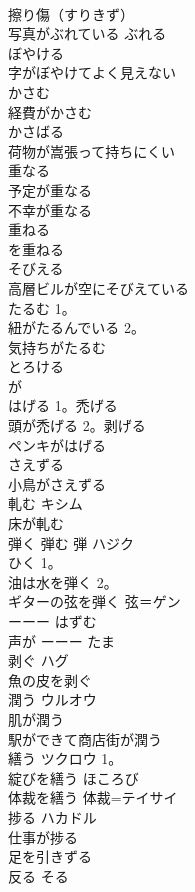 \documentclass[8pt]{extreport}
\begin{document}
\begin{CJK}{UTF8}{min}
\\	擦り傷（すりきず）
\\	写真がぶれている ぶれる	
\\	ぼやける	
\\	字がぼやけてよく見えない
\\	かさむ	
\\	経費がかさむ　
\\	かさばる	
\\	荷物が嵩張って持ちにくい
\\	重なる	
\\	予定が重なる 
\\	不幸が重なる 
\\	重ねる 
\\	を重ねる	
\\	そびえる	
\\	高層ビルが空にそびえている
\\	たるむ	1。
\\	紐がたるんでいる 2。
\\	気持ちがたるむ 
\\	とろける	
\\	が
\\	はげる	1。禿げる 
\\	頭が禿げる 2。剥げる 
\\	ペンキがはげる
\\	さえずる	
\\	小鳥がさえずる
\\	軋む	キシム 
\\	床が軋む
\\	弾く 弾む 弾	ハジク　
\\	ひく 1。
\\	油は水を弾く 2。
\\	ギターの弦を弾く 弦＝ゲン 
\\	ーーー はずむ 
\\	声が ーーー たま 
\\	剥ぐ	ハグ 
\\	魚の皮を剥ぐ
\\	潤う	ウルオウ 
\\	肌が潤う 
\\	駅ができて商店街が潤う
\\	繕う	ツクロウ 1。
\\	綻びを繕う ほころび　
\\	体裁を繕う 体裁=テイサイ 
\\	捗る	ハカドル 
\\	仕事が捗る 
\\	足を引きずる	
\\	反る	そる 

\end{CJK}
\end{document}
